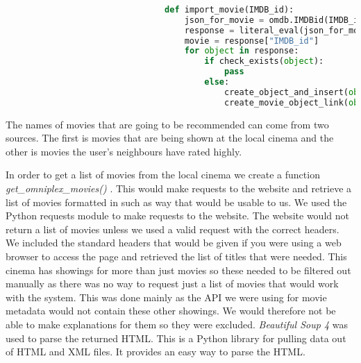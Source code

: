                         \begin{minipage}{\linewidth}
                            \begin{lstlisting}[gobble=32,tabsize=4,caption={Importing movies into the database},label={lst:InsertingMovies},language=Python]
                            
                                def import_movie(IMDB_id):
                                    json_for_movie = omdb.IMDBid(IMDB_id)
                                    response = literal_eval(json_for_movie)
                                    movie = response["IMDB_id"]
                                    for object in response:
                                        if check_exists(object):
                                            pass 
                                        else:
                                            create_object_and_insert(object)
                                            create_movie_object_link(object,movie)
                            \end{lstlisting}
                        \end{minipage}
                      

                    The names of movies that are going to be recommended can come from two sources. The first is movies that are being shown at the local cinema and the other is movies the user's neighbours have rated highly. 

                    In order to get a list of movies from the local cinema we create a function \textit{get\_omniplex\_movies()} . This would make requests to the website and retrieve a list of movies formatted in such as way that would be usable to us. We used the Python requests module to make requests to the website. The website would not return a list of movies unless we used a valid request with the correct headers. We included the standard headers that would be given if you were using a web browser to access the page and retrieved the list of titles that were needed. This cinema has showings for more than just movies so these needed to be filtered out manually as there was no way to request just a list of movies that would work with the system. This was done mainly as the API we were using for movie metadata would not contain these other showings. We would therefore not be able to make explanations for them so they were excluded. \textit{Beautiful Soup 4} was used to parse the returned HTML. This is a Python library for pulling data out of HTML and XML files. It provides an easy way to parse the HTML. 

